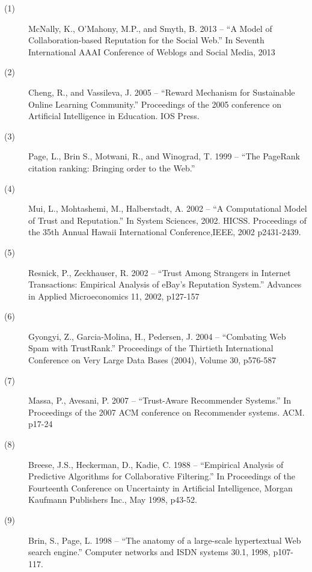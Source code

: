 \documentclass[]{final_report}
\begin{document}
\newpage
\raggedright
\begin{description}


\item[(1)] McNally, K., O'Mahony, M.P., and Smyth, B. 2013 -- ``A Model of Collaboration-based Reputation for the Social Web.'' In Seventh International AAAI Conference of Weblogs and Social Media, 2013

\item[(2)] Cheng, R., and Vassileva, J. 2005 -- ``Reward Mechanism for Sustainable Online Learning Community.'' Proceedings of the 2005 conference on Artificial Intelligence in Education. IOS Press.

\item[(3)] Page, L., Brin S., Motwani, R., and Winograd, T. 1999 -- ``The PageRank citation ranking: Bringing order to the Web.''

\item[(4)] Mui, L., Mohtashemi, M., Halberstadt, A. 2002 -- ``A Computational Model of Trust and Reputation.'' In System Sciences, 2002. HICSS. Proceedings of the 35th Annual Hawaii International Conference,IEEE, 2002 p2431-2439. 

\item[(5)] Resnick, P., Zeckhauser, R. 2002 -- ``Trust Among Strangers in Internet Transactions: Empirical Analysis of eBay's Reputation System.'' Advances in Applied Microeconomics 11, 2002, p127-157

\item[(6)] Gyongyi, Z., Garcia-Molina, H., Pedersen, J. 2004 -- ``Combating Web Spam with TrustRank.'' Proceedings of the Thirtieth International Conference on Very Large Data Bases (2004), Volume 30, p576-587

\item[(7)] Massa, P., Avesani, P. 2007 -- ``Trust-Aware Recommender Systems.'' In Proceedings of the 2007 ACM conference on Recommender systems. ACM. p17-24

\item[(8)] Breese, J.S., Heckerman, D., Kadie, C. 1988 -- ``Empirical Analysis of Predictive Algorithms for Collaborative Filtering.'' In Proceedings of the Fourteenth Conference on Uncertainty in Artificial Intelligence, Morgan Kaufmann Publishers Inc., May 1998, p43-52.

\item[(9)] Brin, S., Page, L. 1998 -- ``The anatomy of a large-scale hypertextual Web search engine.'' Computer networks and ISDN systems 30.1, 1998, p107-117.


\end{description}
\end{document}
